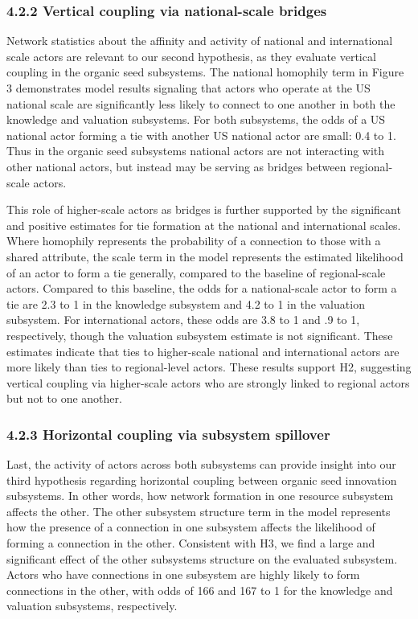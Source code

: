 \documentclass[twoside,12pt,final]{ucthesis-CA2012}
\begin{document}
\begin{ucmainmatter}
{\subsubsection{4.2.2 Vertical coupling via national-scale bridges}\label{vertical-coupling-via-national-scale-bridges}}

Network statistics about the affinity and activity of national and
international scale actors are relevant to our second hypothesis, as
they evaluate vertical coupling in the organic seed subsystems. The
national homophily term in Figure 3 demonstrates model results signaling
that actors who operate at the US national scale are significantly less
likely to connect to one another in both the knowledge and valuation
subsystems. For both subsystems, the odds of a US national actor forming
a tie with another US national actor are small: 0.4 to 1. Thus in the
organic seed subsystems national actors are not interacting with other
national actors, but instead may be serving as bridges between
regional-scale actors.

This role of higher-scale actors as bridges is further supported by the
significant and positive estimates for tie formation at the national and
international scales. Where homophily represents the probability of a
connection to those with a shared attribute, the \textquotesingle scale\textquotesingle{} term in the
model represents the estimated likelihood of an actor to form a tie
generally, compared to the baseline of regional-scale actors. Compared
to this baseline, the odds for a national-scale actor to form a tie are
2.3 to 1 in the knowledge subsystem and 4.2 to 1 in the valuation
subsystem. For international actors, these odds are 3.8 to 1 and .9 to
1, respectively, though the valuation subsystem estimate is not
significant. These estimates indicate that ties to higher-scale national
and international actors are more likely than ties to regional-level
actors. These results support H2, suggesting vertical coupling via
higher-scale actors who are strongly linked to regional actors but not
to one another.

\hypertarget{horizontal-coupling-via-subsystem-spillover}{%
\subsubsection{4.2.3 Horizontal coupling via subsystem spillover}\label{horizontal-coupling-via-subsystem-spillover}}

Last, the activity of actors across both subsystems can provide insight
into our third hypothesis regarding horizontal coupling between organic
seed innovation subsystems. In other words, how network formation in one
resource subsystem affects the other. The \textquotesingle other subsystem structure\textquotesingle{}
term in the model represents how the presence of a connection in one
subsystem affects the likelihood of forming a connection in the other.
Consistent with H3, we find a large and significant effect of the other
subsystems\textquotesingle{} structure on the evaluated subsystem. Actors who have
connections in one subsystem are highly likely to form connections in
the other, with odds of 166 and 167 to 1 for the knowledge and valuation
subsystems, respectively.


\end{ucmainmatter}
\end{document}
